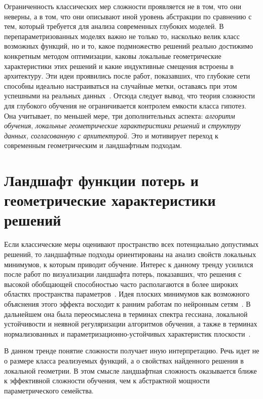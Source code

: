 Ограниченность классических мер сложности проявляется не в том, что они неверны, а в том, что они описывают иной уровень абстракции по сравнению с тем, который требуется для анализа современных глубоких моделей.
В перепараметризованных моделях важно не только то, насколько велик класс возможных функций, но и то, какое подмножество решений реально достижимо конкретным методом оптимизации, каковы локальные геометрические характеристики этих решений и какие индуктивные смещения встроены в архитектуру.
Эти идеи проявились после работ, показавших, что глубокие сети способны идеально настраиваться на случайные метки, оставаясь при этом успешными на реальных данных~\cite{zhang2021rethinking}.
Отсюда следует вывод, что теория сложности для глубокого обучения не ограничивается контролем емкости класса гипотез. Она учитывает, по меньшей мере, три дополнительных аспекта: \textit{алгоритм обучения}, \textit{локальные геометрические характеристики решений} и \textit{структуру данных, согласованную с архитектурой}.
Это и мотивирует переход к современным геометрическим и ландшафтным подходам.

\section{Ландшафт функции потерь и геометрические характеристики решений}

Если классические меры оценивают пространство всех потенциально допустимых решений, то ландшафтные подходы ориентированы на анализ свойств локальных минимумов, к которым приводит обучение.
Интерес к данному тренду усилился после работ по визуализации ландшафта потерь, показавших, что решения с высокой обобщающей способностью часто располагаются в более широких областях пространства параметров~\cite{li2018visualizing,wu2017landscapes,landscape2017algorithms}.
Идея плоских минимумов как возможного объяснения этого эффекта восходит к ранним работам по нейронным сетям~\cite{hochreiter1997flat}.
В дальнейшем она была переосмыслена в терминах спектра гессиана, локальной устойчивости и неявной регуляризации алгоритмов обучения, а также в терминах нормализованных и параметризационно-устойчивых характеристик плоскости~\cite{normalizedflat2019}.

В данном тренде понятие сложности получает иную интерпретацию. Речь идет не о размере класса реализуемых функций, а о свойствах найденного решения в локальной геометрии.
В этом смысле ландшафтная сложность оказывается ближе к эффективной сложности обучения, чем к абстрактной мощности параметрического семейства.

